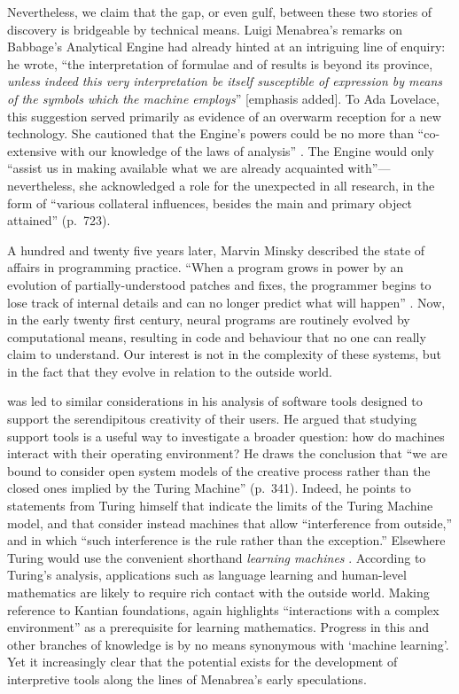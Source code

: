 Nevertheless, we claim that the gap, or even gulf, between these two stories of discovery is bridgeable by technical means.  Luigi Menabrea's \cite[p.~689]{menabrea1842sketch} remarks on Babbage's Analytical Engine had already hinted at an intriguing line of enquiry: he wrote, ``the interpretation of formulae and of results is beyond its province, \emph{unless indeed this very interpretation be itself susceptible of expression by means of the symbols which the machine employs}'' [emphasis added].  To Ada Lovelace, this suggestion served primarily as evidence of an overwarm reception for a new technology.  She cautioned that the Engine's powers could be no more than ``co-extensive with our knowledge of the laws of analysis'' \cite[p.~696]{lovelace}.  The Engine would only ``assist us in making available what we are already acquainted with''---nevertheless, she acknowledged a role for the unexpected in all research, in the form of ``various collateral influences, besides the main and primary object attained'' (p.~723).

A hundred and twenty five years later, Marvin Minsky described the state of affairs in programming practice.  ``When a program grows in power by an evolution of partially-understood patches and fixes, the programmer begins to lose track of internal details and can no longer predict what will happen'' \cite{minsky1967programming}.
Now, in the early twenty first century, neural programs are routinely evolved by computational means, resulting in code and behaviour that no one can really claim to understand.  Our interest is not in the complexity of these systems, but in the fact that they evolve in relation to the outside world.

\citet{Edmonds1994} was led to similar considerations in his analysis of software tools designed to support the serendipitous creativity of their users.  He argued that studying support tools is a useful way to investigate a broader question: how do machines interact with their operating environment?  He draws the conclusion that ``we are bound to consider open system models of the creative process rather than the closed ones implied by the Turing Machine'' (p.~341).  Indeed, he points to statements from Turing himself \cite{turing1948intelligentreport} that indicate the limits of the Turing Machine model, and that consider instead machines that allow ``interference from outside,'' and in which ``such interference is the rule rather than the exception.''  Elsewhere Turing would use the convenient shorthand \emph{learning machines} \cite{turing1950mind}.  According to Turing's analysis, applications such as language learning and human-level mathematics are likely to require rich contact with the outside world.   Making reference to Kantian foundations, \citet[p.~2015]{sloman2008well} again highlights ``interactions with a complex environment'' as a prerequisite for learning mathematics.  Progress in this and other branches of knowledge is by no means synonymous with `machine learning'.  Yet it increasingly clear that the potential exists for the development of interpretive tools along the lines of Menabrea's early speculations.

